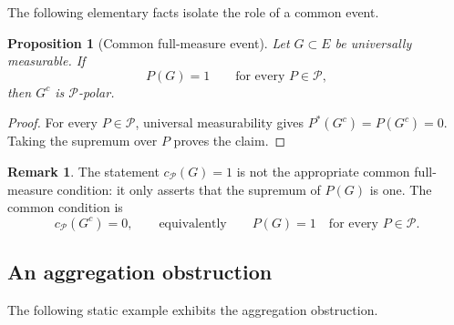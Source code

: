 \documentclass[11pt,reqno]{amsart}
\theoremstyle{plain}
\newtheorem{proposition}[proposition]{Proposition}
\theoremstyle{definition}
\newtheorem{remark}[remark]{Remark}
\newcommand{\cP}{\mathcal P}
\begin{document}
The following elementary facts isolate the role of a common event.

\begin{proposition}[Common full-measure event]\label{prop:fixed-event}
Let \(G\subset E\) be universally measurable.  If
\[
  P(G)=1\qquad\text{for every }P\in\cP,
\]
then \(G^c\) is \(\cP\)-polar.
\end{proposition}

\begin{proof}
For every \(P\in\cP\), universal measurability gives
\(P^*(G^c)=P(G^c)=0\).  Taking the supremum over \(P\) proves the claim.
\end{proof}

\begin{remark}\label{rem:capacity-one}
The statement \(c_{\cP}(G)=1\) is not the appropriate common full-measure
condition: it only asserts that the supremum of \(P(G)\) is one.  The common
condition is
\[
  c_{\cP}(G^c)=0,
  \qquad\text{equivalently}\qquad
  P(G)=1\quad\text{for every }P\in\cP .
\]
\end{remark}

\subsection{An aggregation obstruction}

The following static example exhibits the aggregation obstruction.
\end{document}

